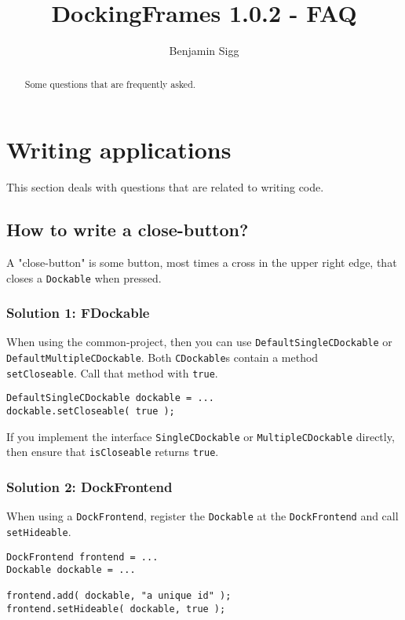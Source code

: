 \documentclass[a4paper,10pt]{article}
\title{DockingFrames 1.0.2 - FAQ}
\author{Benjamin Sigg}
\newcommand{\src}[1]{\lstinline[basicstyle=\normalsize\ttfamily,keywordstyle=\normalsize\ttfamily,identifierstyle=\normalsize\ttfamily]|#1|}
\begin{document}
\maketitle
\tableofcontents
\newpage

\begin{abstract}Some questions that are frequently asked.
\end{abstract}

\section{Writing applications}
This section deals with questions that are related to writing code.
\subsection{How to write a close-button?}
A "close-button" is some button, most times a cross in the upper right edge, that closes a \src{Dockable} when pressed.
\subsubsection{Solution 1: FDockable}
When using the common-project, then you can use \src{DefaultSingleCDockable} or \src{DefaultMultipleCDockable}. Both \src{CDockable}s contain a method \\\src{setCloseable}. Call that method with \src{true}.
\begin{lstlisting}
DefaultSingleCDockable dockable = ...
dockable.setCloseable( true );
\end{lstlisting}
If you implement the interface \src{SingleCDockable} or \src{MultipleCDockable} directly, then ensure that \src{isCloseable} returns \src{true}.

\subsubsection{Solution 2: DockFrontend}
When using a \src{DockFrontend}, register the \src{Dockable} at the \src{DockFrontend} and call \src{setHideable}.
\begin{lstlisting}
DockFrontend frontend = ...
Dockable dockable = ...

frontend.add( dockable, "a unique id" );
frontend.setHideable( dockable, true );
\end{lstlisting}
\end{document}
